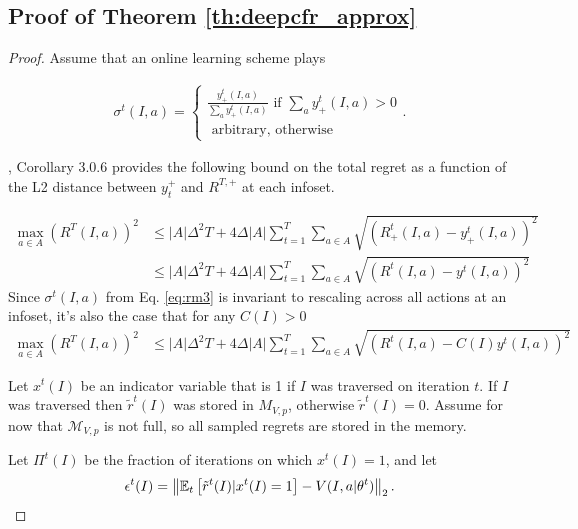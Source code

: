\documentclass{article}
\newcommand{\noam}[1]{\textbf{\textcolor{cyan}{#1}}}
\begin{document}
\subsection{Proof of Theorem \ref{th:deepcfr_approx}}
\label{app:proof_approx}
\begin{proof}

Assume that an online learning scheme plays

\begin{align}
\label{eq:rm3}
\sigma^t(I,a) = 
\begin{cases}
\frac{y_+^t(I,a)}{\sum_a{y_+^t(I,a)}}\textrm{\ if\ } \sum_a {y_+^t(I,a)} > 0 \\
\textrm{\ arbitrary,\ otherwise}
\end{cases}.
\end{align}


\citealt{Morrill16:Using}, Corollary 3.0.6 provides the following bound on the total regret as a function of the L2 distance between $y_t^+$ and $R^{T,+}$ at each infoset.

\begin{align}
    \label{eq:sigma_y}
    \max_{a\in A} (R^T(I,a))^2 & \leq |A| \Delta^2 T  + 4 \Delta |A| \sum_{t=1}^T  \sum_{a\in A} \sqrt{(R_+^t(I,a) - y_+^t(I,a))^2 } \\
    & \leq |A| \Delta^2 T  + 4 \Delta |A| \sum_{t=1}^T  \sum_{a\in A} \sqrt{(R^t(I,a) - y^t(I,a))^2 }
\end{align}
Since $\sigma^t(I, a)$ from Eq. \ref{eq:rm3} is invariant to rescaling across all actions at an infoset, it's also the case that for any $C(I) > 0$ 
\begin{align}
    \label{eq:sigma_y2}
    \max_{a\in A} (R^T(I,a))^2 & \leq |A| \Delta^2 T  + 4 \Delta |A| \sum_{t=1}^T  \sum_{a\in A} \sqrt{(R^t(I,a) - C(I) y^t(I,a))^2 }
\end{align}

Let $x^t(I)$ be an indicator variable that is 1 if $I$ was traversed on iteration $t$. If $I$ was traversed then $\tilde{r}^t(I)$ was stored in $M_{V,p}$, otherwise $\tilde{r}^t(I)=0$. Assume for now that $\mathcal{M}_{V,p}$ is not full, so all sampled regrets are stored in the memory.

Let $\Pi^t(I)$ be the fraction of iterations on which $x^t(I)=1$, and let $$\epsilon^t(I)=\left\lVert \mathbb{E}_t \left[ \tilde{r}^t(I) | x^t(I) = 1 \right] - V(I,a|\theta^t) \right\rVert_2.$$



\end{proof}
\end{document}
